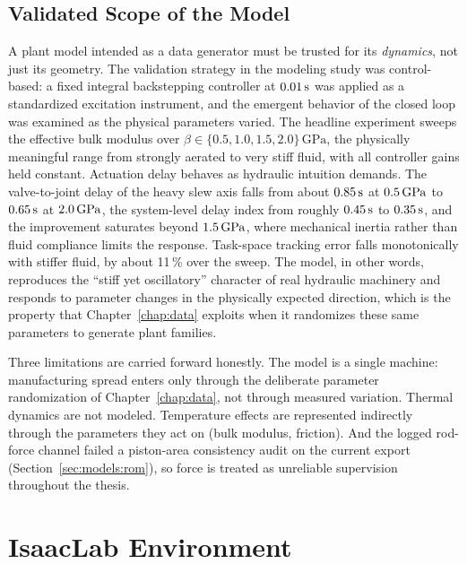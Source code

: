 \subsection{Validated Scope of the Model}
\label{sec:sys:simscape-validation}

A plant model intended as a data generator must be trusted for its
\emph{dynamics}, not just its geometry. The validation strategy in the
modeling study was control-based: a fixed integral backstepping
controller at $\unit[0.01]{s}$ was applied as a standardized excitation
instrument, and the emergent behavior of the closed loop was examined
as the physical parameters varied. The headline experiment sweeps the
effective bulk modulus over $\beta \in \{0.5, 1.0, 1.5, 2.0\}\,
\mathrm{GPa}$, the physically meaningful range from strongly aerated to
very stiff fluid, with all controller gains held constant. Actuation delay behaves as hydraulic intuition demands. The valve-to-joint
delay of the heavy slew axis falls from about $\unit[0.85]{s}$ at $\unit[0.5]{GPa}$ to $\unit[0.65]{s}$ at
$\unit[2.0]{GPa}$, the system-level delay index from roughly
$\unit[0.45]{s}$ to $\unit[0.35]{s}$, and the improvement saturates
beyond $\unit[1.5]{GPa}$, where mechanical inertia rather than fluid
compliance limits the response. Task-space tracking error falls
monotonically with stiffer fluid, by about 11\,\% over the sweep. The
model, in other words, reproduces the ``stiff yet oscillatory''
character of real hydraulic machinery and responds to parameter changes
in the physically expected direction, which is the property that Chapter~\ref{chap:data} exploits when it randomizes these same
parameters to generate plant families.



Three limitations are carried forward honestly. The model is a single
machine: manufacturing spread enters only through the deliberate
parameter randomization of Chapter~\ref{chap:data}, not through
measured variation. Thermal dynamics are not modeled. Temperature
effects are represented indirectly through the parameters they act on
(bulk modulus, friction). And the logged rod-force channel failed a
piston-area consistency audit on the current export
(Section~\ref{sec:models:rom}), so force is treated as unreliable
supervision throughout the thesis.

\section{IsaacLab Environment}
\label{sec:sys:isaaclab}

